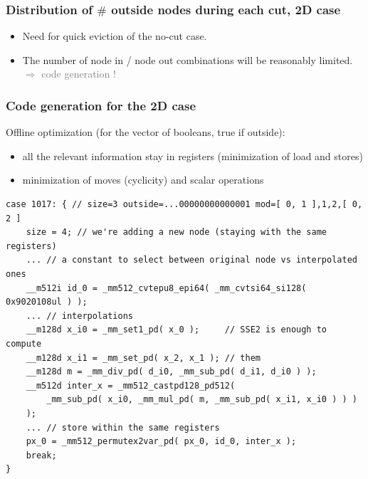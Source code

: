 \documentclass[aspectratio=169]{beamer}
\begin{document}
\begin{frame}
    \frametitle{Distribution of $\#$ outside nodes during each cut, 2D case}

    \begin{minipage}[c][0.6\textheight][c]{0.4\textwidth}
        
    \end{minipage}
    \textwidth
    \begin{minipage}{0.55\textwidth}
        \begin{itemize}
            \item Need for quick eviction of the no-cut case.
            
            \bigskip
            \item The number of node in / node out combinations will be reasonably limited. 
            \\ \hfill {\textcolor{gray}{$\Rightarrow$ code generation !}}
        \end{itemize}
    \end{minipage}
\end{frame}


\begin{frame}[fragile]
    \frametitle{Code generation for the 2D case}

    Offline optimization (for the vector of booleans, true if outside):
    \begin{itemize}
        \item all the relevant information stay in registers 
              (minimization of load and stores)
        \item minimization of moves (cyclicity) and scalar operations
    \end{itemize}

\begin{footnotesize}
\begin{lstlisting} 
case 1017: { // size=3 outside=...00000000000001 mod=[ 0, 1 ],1,2,[ 0, 2 ]
    size = 4; // we're adding a new node (staying with the same registers)
    ... // a constant to select between original node vs interpolated ones
    __m512i id_0 = _mm512_cvtepu8_epi64( _mm_cvtsi64_si128( 0x9020108ul ) );
    ... // interpolations
    __m128d x_i0 = _mm_set1_pd( x_0 );     // SSE2 is enough to compute 
    __m128d x_i1 = _mm_set_pd( x_2, x_1 ); // them
    __m128d m = _mm_div_pd( d_i0, _mm_sub_pd( d_i1, d_i0 ) );
    __m512d inter_x = _mm512_castpd128_pd512( 
        _mm_sub_pd( x_i0, _mm_mul_pd( m, _mm_sub_pd( x_i1, x_i0 ) ) )
    );
    ... // store within the same registers
    px_0 = _mm512_permutex2var_pd( px_0, id_0, inter_x );
    break;
}
\end{lstlisting}
\end{footnotesize}
\end{frame}
\end{document}
